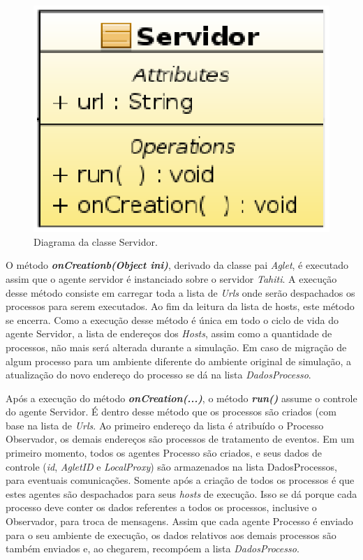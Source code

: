 \begin{figure}[htb]
  \centering
  \centerline{\includegraphics[scale=0.6]{imagens/classe_servidor.eps}}
  \caption{Diagrama da classe Servidor.}
\label{fig:classe_servidor}
\end{figure}


O método \textit{\textbf{onCreationb(Object ini)}}, derivado da classe pai \textit{Aglet}, é executado assim que o agente servidor é instanciado sobre o servidor \textit{Tahiti}. A execução desse método consiste em carregar toda a lista de \textit{Urls} onde serão despachados os processos para serem executados. Ao fim da leitura da lista de hosts, este método se encerra. Como a execução desse método é única em todo o ciclo de vida do agente Servidor, a lista de endereços dos
\textit{Hosts}, assim como a quantidade de processos, não mais será alterada durante a simulação. Em caso de migração de algum processo para um ambiente diferente do ambiente original de simulação, a atualização do novo endereço do processo se dá na lista \textit{DadosProcesso}.

Após a execução do método \textit{\textbf{onCreation(...)}}, o método \textit{\textbf{run()}} assume o controle do agente Servidor. É dentro desse método que os processos são criados (com base na lista de \textit{Urls}. Ao primeiro endereço da lista é atribuído o Processo Observador, os demais endereços são processos de tratamento de eventos. Em um primeiro momento, todos os agentes Processo são criados, e seus dados de controle (\textit{id}, \textit{AgletID} e \textit{LocalProxy}) são armazenados na lista DadosProcessos, para eventuais comunicações. Somente após a criação de todos os processos é que estes agentes são despachados para seus \textit{hosts} de execução. Isso se dá porque cada processo deve conter os dados referentes a todos os processos, inclusive o Observador, para troca de mensagens. Assim que cada agente Processo é enviado para o seu ambiente de execução, os dados relativos aos demais processos são também enviados e, ao chegarem, recompóem a lista \textit{DadosProcesso}.

